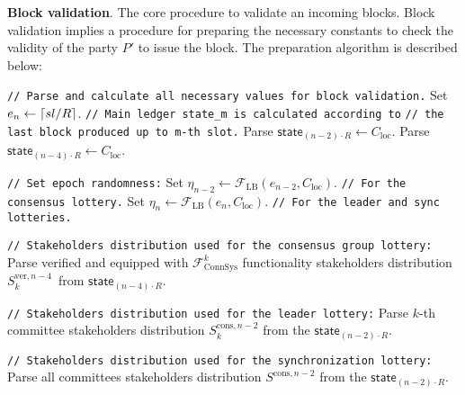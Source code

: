 \textbf{Block validation}.\label{apndx:prepare-block-validation}
The core procedure to validate an incoming blocks.
Block validation implies a procedure for preparing the necessary constants to check the validity of the party $P'$ to issue the block.
The preparation algorithm is described below:
\begin{protocol}
    \caption{$\textsf{PrepareForBlockValidation}(P, \text{sid}, sl, R, l_{\text{VRF}}, K_{\text{f}}, C_{\text{loc}},
    v_{P'}^{\text{vrf}},  \mathbf{S}_{\text{id}} = \{S_k^{\text{id}}\}_{k=1}^K,
    \mathbf{f}_{\text{lead}} =  \{f^{\text{lead}}_k\}_{k=1}^K,
    \mathbf{f}_{\text{cons}} = \{f^{\text{cons}}_k\}_{k=1}^K)$}
    \begin{algorithmic}[1]
        \noindent
        \lstinline|// Parse and calculate all necessary values for block validation.|
        \State Set $e_n \leftarrow \lceil sl/\\R \rceil$.
        \noindent
        \lstinline|// Main ledger state_m is calculated according to|
        \noindent
        \lstinline|// the last block produced up to m-th slot.|
        \State Parse $\textsf{state}_{(n - 2)\cdot R} \leftarrow C_{\text{loc}}$.
        \State Parse $\textsf{state}_{(n - 4)\cdot R} \leftarrow C_{\text{loc}}$.

        \noindent
        \lstinline|// Set epoch randomness:|
        \State Set ${\eta_{n-2} \leftarrow \mathcal{F}_{\text{LB}}(e_{n-2}, C_{\text{loc}})}$. \lstinline|// For the consensus lottery.|
        \State Set ${\eta_{n} \leftarrow \mathcal{F}_{\text{LB}}(e_{n}, C_{\text{loc}})}$. \lstinline|// For the leader and sync lotteries.|

        \noindent
        \lstinline|// Stakeholders distribution used for the consensus group lottery:|
        \State Parse verified and equipped with $\mathcal{F}^k_{\text{ConnSys}}$ functionality stakeholders distribution $S_k^{\text{ver}, {n - 4}}$\
        from $\textsf{state}_{(n - 4)\cdot R}$.

        \noindent
        \lstinline|// Stakeholders distribution used for the leader lottery:|
        \State Parse $k$-th committee stakeholders distribution $S_k^{\text{cons}, n - 2}$ from the $\textsf{state}_{(n - 2)\cdot R}$.

        \noindent
        \lstinline|// Stakeholders distribution used for the synchronization lottery:|
        \State Parse all committees stakeholders distribution $S^{\text{cons}, n - 2}$ from the $\textsf{state}_{(n - 2)\cdot R}$.


\end{algorithmic}
\end{protocol}
